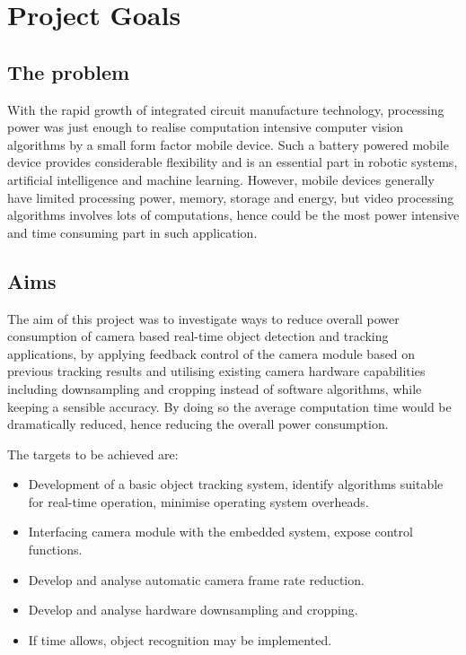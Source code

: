 \chapter{Project Goals} \label{Chapter:Goals}

\section{The problem}

With the rapid growth of integrated circuit manufacture technology, processing power was just enough to realise computation intensive computer vision algorithms by a small form factor mobile device. Such a battery powered mobile device provides considerable flexibility and is an essential part in robotic systems, artificial intelligence and machine learning. However, mobile devices generally have limited processing power, memory, storage and energy, but video processing algorithms involves lots of computations, hence could be the most power intensive and time consuming part in such application.

\section{Aims}

The aim of this project was to investigate ways to reduce overall power consumption of camera based real-time object detection and tracking applications, by applying feedback control of the camera module based on previous tracking results and utilising existing camera hardware capabilities including downsampling and cropping instead of software algorithms, while keeping a sensible accuracy. By doing so the average computation time would be dramatically reduced, hence reducing the overall power consumption.

The targets to be achieved are:

\begin{itemize}
  \item Development of a basic object tracking system, identify algorithms suitable for real-time operation, minimise operating system overheads.
  \item Interfacing camera module with the embedded system, expose control functions.
  \item Develop and analyse automatic camera frame rate reduction.
  \item Develop and analyse hardware downsampling and cropping.
  \item If time allows, object recognition may be implemented.
\end{itemize}
